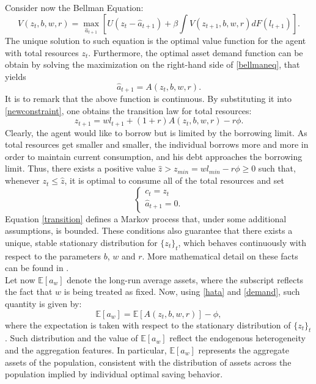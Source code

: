 \documentclass[12pt]{article}
\begin{document}
Consider now the Bellman Equation:
\begin{equation}
\label{bellmaneq}
V\left(z_t, b, w, r \right) = \max_{\hat{a}_{t+1}}\left[U\left(z_t - \hat{a}_{t+1}\right) + \beta \int V(z_{t+1},b, w,r)dF(l_{t+1}) \right].
\end{equation}
The unique solution to such equation is the optimal value function for the agent with total resources $z_t$. Furthermore, the optimal asset demand function can be obtain by solving the maximization on the right-hand side of \ref{bellmaneq}, that yields
\begin{equation}
\label{demand}
\hat{a}_{t+1} = A(z_t, b, w, r).
\end{equation}
It is to remark that the above function is continuous. By substituting it into \ref{newconstraint}, one obtains the transition law for total resources:
\begin{equation}
\label{transition}
z_{t+1} = wl_{t+1} + (1+r)A(z_t, b, w, r) - r\phi.
\end{equation}
Clearly, the agent would like to borrow but is limited by the borrowing limit. As total resources get smaller and smaller, the individual borrows more and more in order to maintain current consumption, and his debt approaches the borrowing limit. Thus, there exists a positive value $\hat{z}>z_{min}=wl_{min} - r\phi \geq 0$ such that, whenever $z_t \leq \hat{z}$, it is optimal to consume all of the total resources and set
\begin{equation*}
\begin{cases}
c_t = z_t \\
\hat{a}_{t+1} = 0.
\end{cases}
\end{equation*}
Equation \ref{transition} defines a Markov process that, under some additional assumptions, is bounded. These conditions also guarantee that there exists a unique, stable stationary distribution for $\{z_t\}_t$, which behaves continuously with respect to the parameters $b$, $w$ and $r$. More mathematical detail on these facts can be found in \cite{aiya93}. \\
Let now $\mathbb E\left[ a_w \right]$ denote the long-run average assets, where the subscript reflects the fact that $w$ is being treated as fixed. Now, using \ref{hata} and \ref{demand}, such quantity is given by:
\begin{equation}
\mathbb E\left[a_w \right] = \mathbb E \left[A(z_t, b, w, r)\right] - \phi,
\end{equation}
where the expectation is taken with respect to the stationary distribution of $\{z_t\}_t$. Such distribution and the value of $\mathbb E\left[a_w \right]$ reflect the endogenous heterogeneity and the aggregation features. In particular, $\mathbb E\left[a_w \right]$ represents the aggregate assets of the population, consistent with the distribution of assets across the population implied by individual optimal saving behavior. \\
\end{document}

